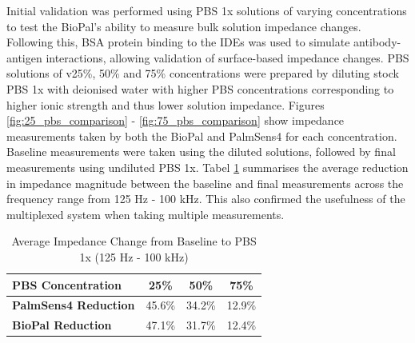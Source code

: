 Initial validation was performed using PBS 1x solutions of varying concentrations to test the BioPal's ability to measure bulk solution impedance changes. Following this, BSA protein binding to the \acp{IDE} was used to simulate antibody-antigen interactions, allowing validation of surface-based impedance changes.
PBS solutions of v25\%, 50\% and 75\% concentrations were prepared by diluting stock PBS 1x with deionised water with higher PBS concentrations corresponding to higher ionic strength and thus lower solution impedance. Figures \ref{fig:25_pbs_comparison} - \ref{fig:75_pbs_comparison} show impedance measurements taken by both the BioPal and PalmSens4 for each concentration. Baseline measurements were taken using the diluted solutions, followed by final measurements using undiluted PBS 1x. Tabel \ref{tab:pbs} summarises the average reduction in impedance magnitude between the baseline and final measurements across the frequency range from 125 Hz - 100 kHz. This also confirmed the usefulness of the multiplexed system when taking multiple measurements.
\begin{table}[H]
\centering
\caption{Average Impedance Change from Baseline to PBS 1x (125 Hz - 100 kHz)}
\label{tab:pbs}
\begin{tabular}{lccc}
\hline
\textbf{PBS Concentration} & \textbf{25\%} & \textbf{50\%} & \textbf{75\%} \\
\hline
\textbf{PalmSens4 Reduction} & 45.6\% & 34.2\% & 12.9\% \\
\textbf{BioPal Reduction} & 47.1\% & 31.7\% & 12.4\% \\
\hline
\end{tabular}
\end{table}
